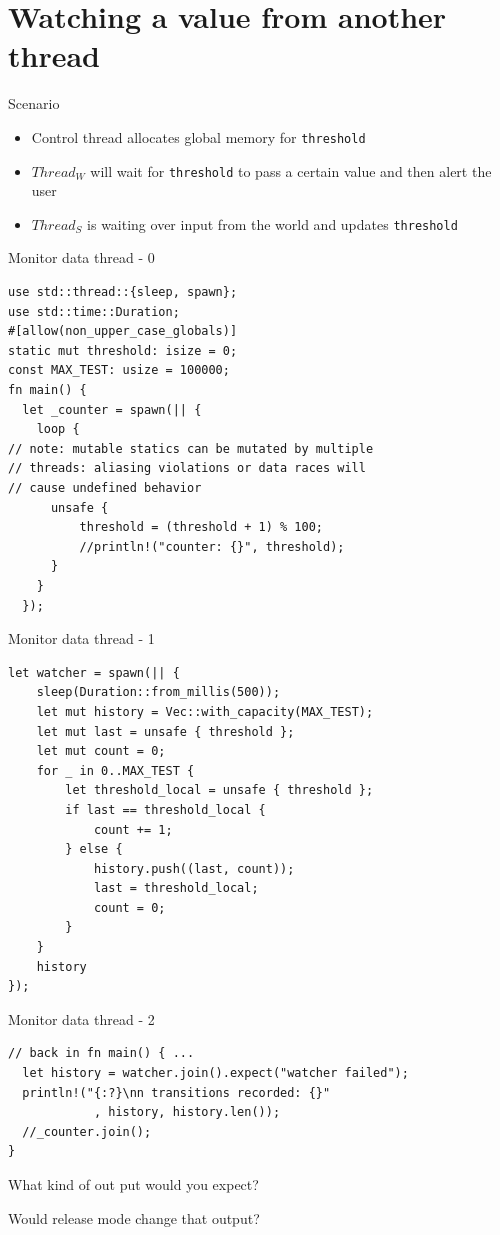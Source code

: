 \documentclass[10pt]{beamer}
\begin{document}
\section{Watching a value from another thread}

\begin{frame}{Scenario}
    \begin{itemize}
        \item Control thread allocates global memory for \texttt{threshold}
        \item $Thread_W$ will wait for \texttt{threshold} to pass a certain value and then alert the user
        \item $Thread_S$ is waiting over input from the world and updates \texttt{threshold}
    \end{itemize}
\end{frame}

\begin{frame}[fragile]{Monitor data thread - 0}
\begin{verbatim}
use std::thread::{sleep, spawn};
use std::time::Duration;
#[allow(non_upper_case_globals)]
static mut threshold: isize = 0;
const MAX_TEST: usize = 100000;
fn main() {
  let _counter = spawn(|| {
    loop {
// note: mutable statics can be mutated by multiple 
// threads: aliasing violations or data races will 
// cause undefined behavior
      unsafe {
          threshold = (threshold + 1) % 100;
          //println!("counter: {}", threshold);
      }
    }
  });
\end{verbatim}
\end{frame}

\begin{frame}[fragile]{Monitor data thread - 1}
\begin{verbatim}
let watcher = spawn(|| {
    sleep(Duration::from_millis(500));
    let mut history = Vec::with_capacity(MAX_TEST);
    let mut last = unsafe { threshold };
    let mut count = 0;
    for _ in 0..MAX_TEST {
        let threshold_local = unsafe { threshold };
        if last == threshold_local {
            count += 1;
        } else {
            history.push((last, count));
            last = threshold_local;
            count = 0;
        }
    }
    history
});

\end{verbatim}
\end{frame}

\begin{frame}[fragile]{Monitor data thread - 2}
\begin{verbatim}
// back in fn main() { ...
  let history = watcher.join().expect("watcher failed");
  println!("{:?}\nn transitions recorded: {}"
            , history, history.len());
  //_counter.join();
}

\end{verbatim}
What kind of out put would you \alert{expect}?

Would release mode change that output?
\end{frame}
\end{document}
